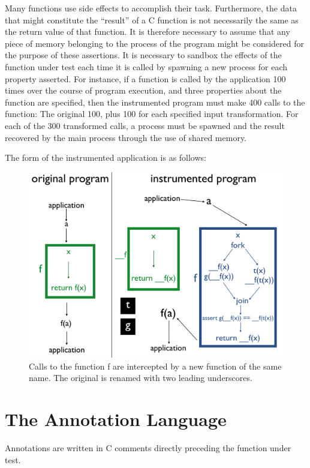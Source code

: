 \documentclass[notitlepage]{article}
\begin{document}
Many functions use side effects to accomplish their task. Furthermore, the data that might constitute the ``result'' of a C function is not necessarily the same as the return value of that function. It is therefore necessary to assume that any piece of memory belonging to the process of the program might be considered for the purpose of these assertions. It is necessary to sandbox the effects of the function under test each time it is called by spawning a new process for each property asserted. For instance, if a function is called by the application 100 times over the course of program execution, and three properties about the function are specified, then the instrumented program must make 400 calls to the function: The original 100, plus 100 for each specified input transformation. For each of the 300 transformed calls, a process must be spawned and the result recovered by the main process through the use of shared memory.

The form of the instrumented application is as follows:

\begin{figure}[ht!]
\centering
\includegraphics[width=175mm]{calico_pic2.png}
\caption{Calls to the function f are intercepted by a new function of the same name. The original is renamed with two leading underscores.}
\end{figure}

\section{The Annotation Language}

Annotations are written in C comments directly preceding the function under test.
\end{document}
